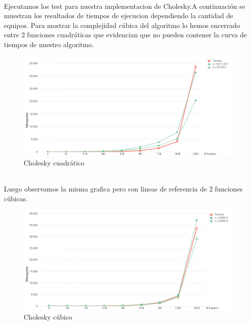 \\
Ejecutamos los test para nuestra implementacion de Cholesky.A continuación se muestran los resultados de tiempos de ejecucion dependiendo la cantidad de equipos. Para mostrar la complejidad cúbica del algoritmo lo hemos encerrado entre 2 funciones cuadráticas que evidencian que no pueden contener la curva de tiempos de nuestro algoritmo.\\


\begin{figure}[H]
\centering
\includegraphics[width=1\textwidth]{IMG/cholesky cuadratico.png}
\caption{Cholesky cuadrático}
\label{fig:Cholesky cuadrático}
\end{figure}

\\

Luego observamos la misma grafica pero con lineas de referencia de 2 funciones cúbicas.\\

\begin{figure}[H]
\centering
\includegraphics[width=1\textwidth]{IMG/cholesky cubicos.png}
\caption{Cholesky cúbico}
\label{fig:Cholesky cúbico}
\end{figure}

\\

